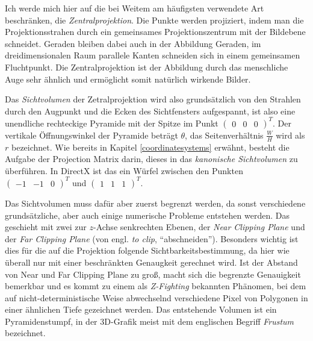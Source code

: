 Ich werde mich hier auf die bei Weitem am häufigsten verwendete Art beschränken, die \emph{Zentralprojektion}. Die Punkte werden projiziert, indem man die Projektionsstrahen durch ein gemeinsames Projektionszentrum mit der Bildebene schneidet. Geraden bleiben dabei auch in der Abbildung Geraden, im dreidimensionalen Raum parallele Kanten schneiden sich in einem gemeinsamen Fluchtpunkt. Die Zentralprojektion ist der Abbildung durch das menschliche Auge sehr ähnlich und ermöglicht somit natürlich wirkende Bilder.


Das \emph{Sichtvolumen} der Zetralprojektion wird also grundsätzlich von den Strahlen durch den Augpunkt und die Ecken des Sichtfensters aufgespannt, ist also eine unendliche rechteckige Pyramide mit der Spitze im Punkt $\begin{pmatrix}0 & 0 & 0\end{pmatrix}^T$. Der vertikale Öffnungswinkel der Pyramide beträgt $\theta$, das Seitenverhältnis $\frac{W}{H}$ wird als $r$ bezeichnet. Wie bereits in Kapitel \ref{coordinatesystems} erwähnt, besteht die Aufgabe der Projection Matrix darin, dieses in das \emph{kanonische Sichtvolumen} zu überführen. In DirectX ist das ein Würfel zwischen den Punkten $\begin{pmatrix} -1 & -1 & 0 \end{pmatrix}^T$ und $\begin{pmatrix} 1 & 1 & 1 \end{pmatrix}^T$.

Das Sichtvolumen muss dafür aber zuerst begrenzt werden, da sonst verschiedene grundsätzliche, aber auch einige numerische Probleme entstehen werden. Das geschieht mit zwei zur $z$-Achse senkrechten Ebenen, der \emph{Near Clipping Plane} und der \emph{Far Clipping Plane} (von engl. \emph{to clip}, \enquote{abschneiden}). Besonders wichtig ist dies für die auf die Projektion folgende Sichtbarkeitsbestimmung, da hier wie überall nur mit einer beschränkten Genaugkeit gerechnet wird. Ist der Abstand von Near und Far Clipping Plane zu groß, macht sich die begrenzte Genauigkeit bemerkbar und es kommt zu einem als \emph{Z-Fighting} bekannten Phänomen, bei dem auf nicht-deterministische Weise abwechselnd verschiedene Pixel von Polygonen in einer ähnlichen Tiefe gezeichnet werden. Das entstehende Volumen ist ein Pyramidenstumpf, in der 3D-Grafik meist mit dem englischen Begriff \emph{Frustum} bezeichnet.


